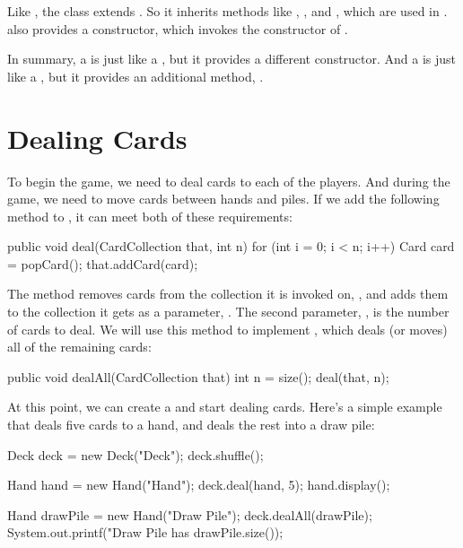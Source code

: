 Like , the  class extends .
So it inherits methods like , , and , which are used in .
 also provides a constructor, which invokes the constructor of .

In summary, a  is just like a , but it provides a different constructor.
And a  is just like a , but it provides an additional method, .



\section{Dealing Cards}
\label{dealing}

To begin the game, we need to deal cards to each of the players.
And during the game, we need to move cards between hands and piles.
If we add the following method to , it can meet both of these requirements:

\begin{code}
public void deal(CardCollection that, int n) {
    for (int i = 0; i < n; i++) {
        Card card = popCard();
        that.addCard(card);
    }
}
\end{code}

The  method removes cards from the collection it is invoked on, , and adds them to the collection it gets as a parameter, .
The second parameter, , is the number of cards to deal.
We will use this method to implement , which deals (or moves) all of the remaining cards:

\begin{code}
public void dealAll(CardCollection that) {
    int n = size();
    deal(that, n);
}
\end{code}

At this point, we can create a  and start dealing cards.
Here's a simple example that deals five cards to a hand, and deals the rest into a draw pile:

\begin{code}
Deck deck = new Deck("Deck");
deck.shuffle();

Hand hand = new Hand("Hand");
deck.deal(hand, 5);
hand.display();

Hand drawPile = new Hand("Draw Pile");
deck.dealAll(drawPile);
System.out.printf("Draw Pile has %
                  drawPile.size());
\end{code}

